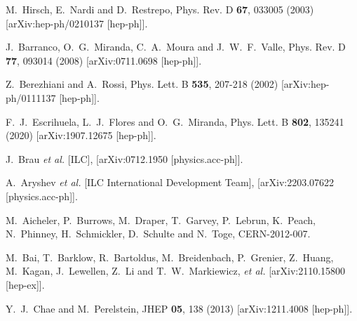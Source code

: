 \documentclass[14pt]{article}
\begin{document}
{\begin{thebibliography}{99}
M.~Hirsch, E.~Nardi and D.~Restrepo,
Phys. Rev. D \textbf{67}, 033005 (2003)
[arXiv:hep-ph/0210137 [hep-ph]].

J.~Barranco, O.~G.~Miranda, C.~A.~Moura and J.~W.~F.~Valle,
Phys. Rev. D \textbf{77}, 093014 (2008)
[arXiv:0711.0698 [hep-ph]].

Z.~Berezhiani and A.~Rossi,
Phys. Lett. B \textbf{535}, 207-218 (2002)
[arXiv:hep-ph/0111137 [hep-ph]].

F.~J.~Escrihuela, L.~J.~Flores and O.~G.~Miranda,
Phys. Lett. B \textbf{802}, 135241 (2020)
[arXiv:1907.12675 [hep-ph]].


J.~Brau \textit{et al.} [ILC],
[arXiv:0712.1950 [physics.acc-ph]].

A.~Aryshev \textit{et al.} [ILC International Development Team],
[arXiv:2203.07622 [physics.acc-ph]].


M.~Aicheler, P.~Burrows, M.~Draper, T.~Garvey, P.~Lebrun, K.~Peach, N.~Phinney, H.~Schmickler, D.~Schulte and N.~Toge,
CERN-2012-007.

M.~Bai, T.~Barklow, R.~Bartoldus, M.~Breidenbach, P.~Grenier, Z.~Huang, M.~Kagan, J.~Lewellen, Z.~Li and T.~W.~Markiewicz, \textit{et al.}
[arXiv:2110.15800 [hep-ex]].


Y.~J.~Chae and M.~Perelstein,
JHEP \textbf{05}, 138 (2013)
[arXiv:1211.4008 [hep-ph]].


\end{thebibliography}}
\end{document}
